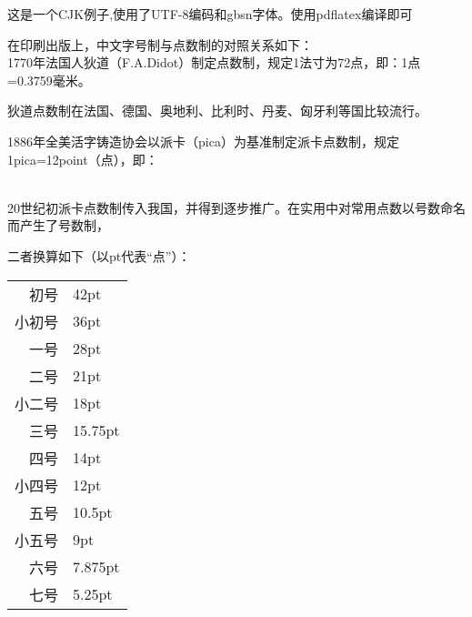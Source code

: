 \documentclass{article}
\begin{document}
\begin{CJK}{UTF8}{gbsn}
这是一个CJK例子,使用了UTF-8编码和gbsn字体。使用pdflatex编译即可


在印刷出版上，中文字号制与点数制的对照关系如下：\\

 1770年法国人狄道（F.A.Didot）制定点数制，规定1法寸为72点，即：1点=0.3759毫米。

 狄道点数制在法国、德国、奥地利、比利时、丹麦、匈牙利等国比较流行。

 1886年全美活字铸造协会以派卡（pica）为基准制定派卡点数制，规定1pica=12point（点），即：

 \\

 20世纪初派卡点数制传入我国，并得到逐步推广。在实用中对常用点数以号数命名而产生了号数制，

 二者换算如下（以pt代表“点”）：\\

 \begin{center}

 \begin{tabular}{r@{\ =\ }l}

 初号& 42pt\\

 小初号& 36pt\\

 一号& 28pt\\

 二号& 21pt\\

 小二号& 18pt\\

 三号& 15.75pt\\

 四号& 14pt\\

 小四号& 12pt\\

 五号& 10.5pt\\

 小五号& 9pt\\

 六号 & 7.875pt\\

 七号 & 5.25pt

 \end{tabular}

 \end{center}



\end{CJK}
\end{document}
